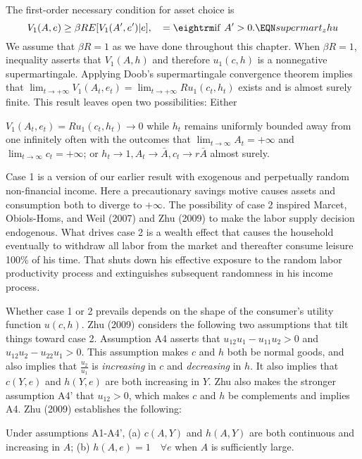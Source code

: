 \medskip
{}
The first-order necessary condition for asset choice is
$$ V_1(A,e) \geq \beta R E [ V_1(A',e') |e ], \quad = {\rm if} \ A' > 0 . \EQN supermart_zhu$$
We assume that $\beta R =1 $ as we have done throughout this chapter. When $\beta R =1$,
inequality  asserts that $V_1(A,h)$ and therefore $u_1(c,h)$ is a
nonnegative supermartingale.  Applying Doob's supermartingale convergence theorem  implies that
$\lim_{t\rightarrow +\infty} V_1(A_t, e_t) =\lim_{t \rightarrow +\infty} R u_1(c_t, h_t)  $ exists and is almost surely finite.
This result leaves open two possibilities: Either

\medskip
{} $V_1(A_t, e_t) = R u_1(c_t, h_t) \rightarrow 0$ while $h_t$ remains uniformly bounded away from  one infinitely often with the
outcomes that
$\lim_{t\rightarrow \infty } A_t = +\infty $ and $\lim_{t\rightarrow \infty} c_t = + \infty$; or
\medskip
{}  $h_t \rightarrow 1 , A_t \rightarrow \bar A, c_t \rightarrow r \bar A$ almost surely.
\medskip

Case 1 is a version of our earlier result with exogenous and perpetually random non-financial income.  Here  a precautionary savings motive
causes assets and consumption both to diverge to $+\infty$.  The possibility of case 2 inspired
Marcet, Obiols-Homs, and Weil (2007) and Zhu (2009) to make  the labor supply decision  endogenous. What drives case 2 is a wealth effect that causes the household eventually
to withdraw all labor from the market and thereafter consume leisure 100\% of his time. That shuts down his effective exposure to the random labor productivity process and  extinguishes subsequent randomness in his income process.

Whether case 1 or 2 prevails depends on the shape of the consumer's utility function $u(c,h)$.  Zhu (2009)
considers the following two assumptions that tilt things toward case 2. Assumption A4 asserts
that $u_{12} u_1 - u_{11}u_2 >0 $ and $u_{12} u_2 - u_{22} u_1 >0$.  This assumption makes
$c$ and $h$ both be normal goods, and also implies that ${\frac{u_2}{u_1}}$ is {\it increasing} in $c$ and {\it decreasing} in $h$. It also
implies that $c(Y,e)$ and $h(Y,e)$ are both increasing in $Y$.  Zhu also makes the stronger assumption
A4' that $u_{12} >0$, which makes $c$ and $h$ be complements and implies A4.
Zhu (2009) establishes  the following:

\medskip
{}   Under assumptions A1-A4', (a) $c(A,Y)$ and $h(A,Y)$ are both continuous and increasing in $A$;
(b) $h(A,e)=1 \quad \forall e$ when $A$ is sufficiently large.
\medskip

